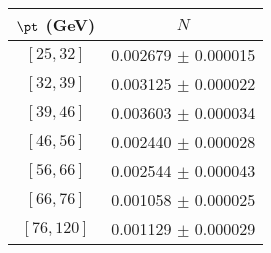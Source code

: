 \begin{tabular}{c||c}
$\pt$ (GeV) & $N$  \\
\hline
$[25, 32]$ & 0.002679 $\pm$ 0.000015\\
$[32, 39]$ & 0.003125 $\pm$ 0.000022\\
$[39, 46]$ & 0.003603 $\pm$ 0.000034\\
$[46, 56]$ & 0.002440 $\pm$ 0.000028\\
$[56, 66]$ & 0.002544 $\pm$ 0.000043\\
$[66, 76]$ & 0.001058 $\pm$ 0.000025\\
$[76, 120]$ & 0.001129 $\pm$ 0.000029\\
\end{tabular}
